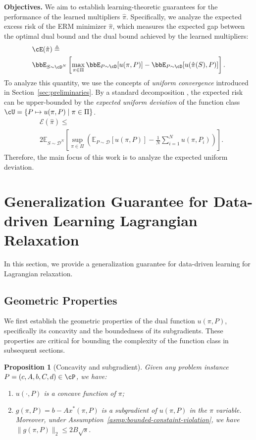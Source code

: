 \documentclass{article}
\theoremstyle{plain}
\newtheorem{proposition}[theorem]{Proposition}
\theoremstyle{definition}
\theoremstyle{remark}
\begin{document}
\textbf{Objectives.} We aim to establish learning-theoretic guarantees for the performance of the learned multipliers $\hat{\pi}$. Specifically, we analyze the expected excess risk of the ERM minimizer $\hat{\pi}$, which measures the expected gap between the optimal dual bound and the dual bound achieved by the learned multipliers:
\begin{align*}
    &\cE(\hat{\pi}) \triangleq \\
    &\bbE_{S \sim \cD^N}\left[\max_{\pi \in \Pi}\bbE_{P \sim \cD}[u(\pi, P)] - \bbE_{P \sim \cD}[u(\hat{\pi}(S), P)]\right].
\end{align*}
To analyze this quantity, we use the concepts of \textit{uniform convergence} introduced in Section~\ref{sec:preliminaries}. By a standard decomposition \citep{shalev2014understanding}, the expected risk can be upper-bounded by the \textit{expected uniform deviation} of the function class $\cU = \{P \mapsto u(\pi, P) \mid \pi \in \Pi\}$.
\begin{align*}
    & \mathcal{E}(\hat{\pi}) \le \\
    & 2 \mathbb{E}_{S \sim \mathcal{D}^N} \left[ \sup_{\pi \in \Pi} \left( \mathbb{E}_{P \sim \mathcal{D}}[u(\pi, P)] - \frac{1}{N}\sum_{i=1}^N u(\pi, P_i) \right) \right].
\end{align*}
Therefore, the main focus of this work is to analyze the expected uniform deviation. 



\section{Generalization Guarantee for Data-driven Learning Lagrangian Relaxation} \label{sec:standard-lagrangian-relaxation}
In this section, we provide a generalization guarantee for data-driven learning for Lagrangian relaxation. 

\subsection{Geometric Properties} \label{sec:geometric-property}
We first establish the geometric properties of the dual function $u(\pi, P)$, specifically its concavity and the boundedness of its subgradients. These properties are critical for bounding the complexity of the function class in subsequent sections.
\begin{proposition}[Concavity and subgradient] \label{prop:geometric-property}
    Given any problem instance $P = (c, A, b, C, d) \in \cP$, we have:
    \begin{enumerate}[label=(\roman*)]
        \item $u(\cdot, P)$ is a concave function of $\pi$;
        \item $g(\pi, P) = b - Ax^*(\pi, P)$ is a subgradient of $u(\pi, P)$ in the $\pi$ variable. Moreover, under Assumption~\ref{asmp:bounded-constaint-violation}, we have $\|g(\pi, P)\|_2 \leq 2B\sqrt{s}$.
    \end{enumerate}
\end{proposition}
\end{document}
